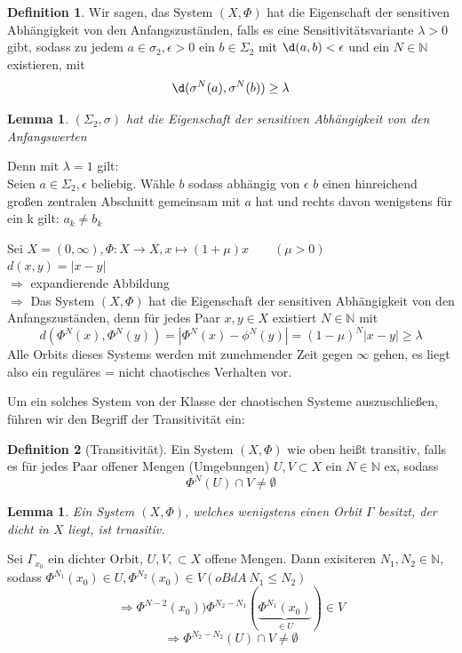 \documentclass[a4paper, 13pt]{scrreprt}
\newtheorem{lemma}[theorem]{Lemma}
\theoremstyle{definition} \newtheorem{definition}{Definition}[section]
\newenvironment{beweis}[1][Beweis]{\begin{trivlist}
\item[\hskip \labelsep {\bfseries #1}]}{\end{trivlist}}
\newenvironment{beispiel}[1][Beispiel]{\begin{trivlist}
\item[\hskip \labelsep {\bfseries #1}]}{\end{trivlist}}
\begin{document}
\begin{definition}
Wir sagen, das System \((X,\Phi)\) hat die Eigenschaft der sensitiven Abhängigkeit von den Anfangszuständen, falls es eine Sensitivitätsvariante \(\lambda > 0\) gibt, sodass zu jedem \(a \in \sigma_2, \epsilon >0\) ein \(b \in \Sigma_2\) mit \(\d(a,b) < \epsilon\) und ein \(N\in \mathbb{N}\) existieren, mit 
	\[\d(\sigma^N(a),\sigma^N(b)) \geq \lambda\]
\end{definition}

\begin{lemma}
\((\Sigma_2,\sigma)\) hat die Eigenschaft der sensitiven Abhängigkeit von den Anfangswerten
\end{lemma}
\begin{beweis}
Denn mit \(\lambda = 1\) gilt: \\
Seien \(a\in\Sigma_2, \epsilon\) beliebig. Wähle \(b\) sodass abhängig von \(\epsilon\) \(b\) einen hinreichend großen zentralen Abschnitt gemeinsam mit \(a\) hat und rechts davon wenigstens für ein k gilt: \(a_k\not= b_k\)
\end{beweis}

\begin{beispiel}
Sei \(X = (0,\infty), \Phi:X\to X, x\mapsto (1+\mu)x \qquad (\mu>0)\)\\
\(d(x,y) = |x-y|\) \\
	\(\Rightarrow\) expandierende Abbildung\\
	\(\Rightarrow\) Das System \((X,\Phi)\) hat die Eigenschaft der sensitiven Abhängigkeit von den Anfangszuständen, denn für jedes Paar \(x,y\in X\) existiert \(N\in\mathbb{N}\) mit
		\[d(\Phi^N(x),\Phi^N(y))= |\Phi^N(x)-\phi^N(y)| = (1-\mu)^N|x-y| \geq \lambda\]
		Alle Orbits dieses Systems werden mit zunehmender Zeit gegen \(\infty\) gehen, es liegt also ein reguläres = nicht chaotisches Verhalten vor.
\end{beispiel}
 
Um ein solches System von der Klasse der chaotischen Systeme auszuschließen, führen wir den Begriff der Transitivität ein:
\begin{definition}[Transitivität]
Ein System \((X,\Phi)\) wie oben heißt transitiv, falls es für jedes Paar offener Mengen (Umgebungen) \(U,V\subset X\) ein \(N\in\mathbb{N}\) ex, sodass 
	\[\Phi^N(U)\cap V \not= \emptyset\]
\end{definition}

\begin{lemma}
Ein System \((X,\Phi)\), welches wenigstens einen Orbit \(\Gamma\) besitzt, der dicht in \(X\) liegt, ist trnasitiv.
\end{lemma}
\begin{beweis}
Sei \(\Gamma_{x_0}\) ein dichter Orbit, \(U,V,\subset X \) offene Mengen. Dann exisiteren \(N_1, N_2 \in \mathbb{N}\), sodass \(\Phi^{N_1}(x_0) \in U, \Phi^{N_2}(x_0) \in V (oBdA\  N_1 \leq N_2)\) \\
\[\Rightarrow \Phi^{N-2}(x_0) ) \Phi^{N_2-N_1}(\underbrace{\Phi^{N_1}(x_0)}_{\in U}) \in V \]
\[\Rightarrow \Phi^{N_2-N_2} (U) \cap V \not= \emptyset \]
\end{beweis}
\end{document}

